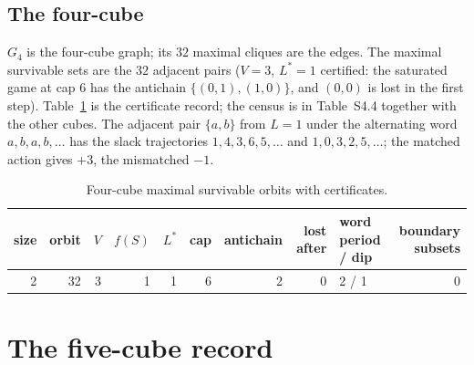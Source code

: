 \documentclass[11pt,a4paper]{article}
\theoremstyle{plain}
\theoremstyle{definition}
\theoremstyle{remark}
\newcommand{\Lstar}{L^{\ast}}
\begin{document}
\subsection{The four-cube}
$G_4$ is the four-cube graph; its $32$ maximal cliques are the edges. The maximal survivable sets are the $32$ adjacent pairs ($V=3$, $\Lstar=1$ certified: the saturated game at cap $6$ has the antichain $\{(0,1),(1,0)\}$, and $(0,0)$ is lost in the first step). Table~\ref{tab:S2max} is the certificate record; the census is in Table~S4.4 together with the other cubes. The adjacent pair $\{a,b\}$ from $L=1$ under the alternating word $a,b,a,b,\dots$ has the slack trajectories $1,4,3,6,5,\dots$ and $1,0,3,2,5,\dots$; the matched action gives $+3$, the mismatched $-1$.
\begin{table}[H]\centering\small
\caption{Four-cube maximal survivable orbits with certificates.}\label{tab:S2max}
\begin{tabular}{rrrrrrrrlr}
\toprule
size & orbit & $V$ & $f(S)$ & $L^\ast$ & cap & antichain & lost after & word period / dip & boundary subsets\\
\midrule
2 & 32 & $3$ & 1 & 1 & 6 & 2 & 0 & 2 / 1 & 0\\
\bottomrule
\end{tabular}
\end{table}
\section{The five-cube record}\label{S:five}
\end{document}
